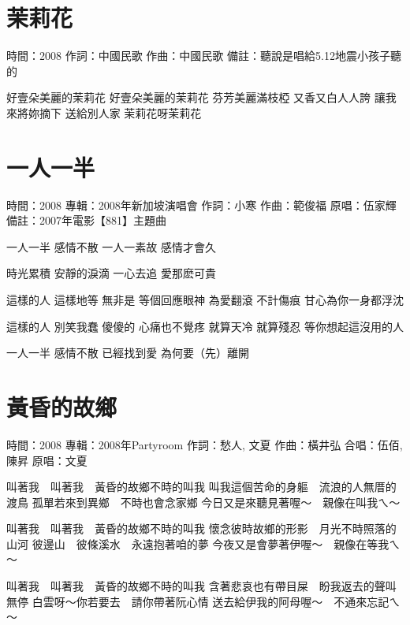 \documentclass[UTF8,a4paper,oneside,twocolumn,12pt]{ctexbook}
\newcommand{\infopair}[2]{\textbullet #1：#2}
\newcommand{\zc}[1][伍佰]{\infopair{作詞}{#1}}
\newcommand{\zq}[1][伍佰]{\infopair{作曲}{#1}}
\newcommand{\zj}[1]{\infopair{專輯}{#1}}
\newcommand{\yc}[1]{\infopair{原唱}{#1}}
\newcommand{\sj}[1]{\infopair{時間}{#1}}
\newcommand{\bz}[1]{\infopair{備註}{#1}}
\newenvironment{info}{\begin{flushleft}\kaishu
	}
	{\end{flushleft}\normalsize\yahei\par}
\newenvironment{lyric}{
	}
{}
\begin{document}
\section{茉莉花}
\begin{info}
	\sj{2008}
	\zc[中國民歌]
	\zq[中國民歌]
	\bz{聽說是唱給5.12地震小孩子聽的}
\end{info}
\begin{lyric}
	好壹朵美麗的茉莉花
	好壹朵美麗的茉莉花
	芬芳美麗滿枝椏 又香又白人人誇
	讓我來將妳摘下 送給別人家
	茉莉花呀茉莉花
\end{lyric}

\section{一人一半}
\begin{info}
	\sj{2008}
	\zj{2008年新加坡演唱會}
	\zc[小寒]
	\zq[範俊福]
	\yc{伍家輝}
	\bz{2007年電影【881】主題曲}
\end{info}
\begin{lyric}
	一人一半 感情不散
	一人一素故 感情才會久

	時光累積 安靜的淚滴
	一心去追 愛那麽可貴

	這樣的人 這樣地等
	無非是 等個回應眼神
	為愛翻滾 不計傷痕
	甘心為你一身都浮沈

	這樣的人 別笑我蠢
	傻傻的 心痛也不覺疼
	就算天冷 就算殘忍
	等你想起這沒用的人

	一人一半 感情不散
	已經找到愛 為何要（先）離開
\end{lyric}

\section{黃昏的故鄉}
\begin{info}
	\sj{2008}
	\zj{2008年Partyroom}
	\zc[愁人, 文夏]
	\zq[橫井弘]
	\infopair{合唱}{伍佰, 陳昇}
	\yc{文夏}
\end{info}
\begin{lyric}
	叫著我　叫著我　黃昏的故鄉不時的叫我
	叫我這個苦命的身軀　流浪的人無厝的渡鳥
	孤單若來到異鄉　不時也會念家鄉
	今日又是來聽見著喔～　親像在叫我ㄟ～

	叫著我　叫著我　黃昏的故鄉不時的叫我
	懷念彼時故鄉的形影　月光不時照落的山河
	彼邊山　彼條溪水　永遠抱著咱的夢
	今夜又是會夢著伊喔～　親像在等我ㄟ～

	叫著我　叫著我　黃昏的故鄉不時的叫我
	含著悲哀也有帶目屎　盼我返去的聲叫無停
	白雲呀～你若要去　請你帶著阮心情
	送去給伊我的阿母喔～　不通來忘記ㄟ～
\end{lyric}
\end{document}
